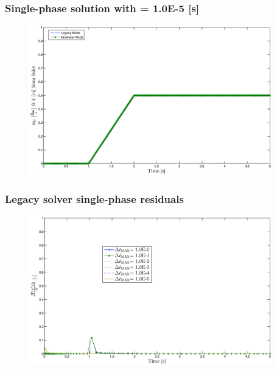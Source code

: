 \documentclass[compress,xcolor=table]{beamer}
\begin{document}
\begin{frame}
\frametitle{Single-phase solution with \dtmax{} = 1.0E-5 {[s]}}

\begin{figure}[h!t]
\centering
\includegraphics[width=0.94\textwidth]{images/single_1em5.eps}
\end{figure}

\end{frame}
\begin{frame}
\frametitle{Legacy solver single-phase residuals}

\begin{figure}[h!t]
\centering
\includegraphics[width=0.94\textwidth]{images/cobra_single_res_v_dt.eps}
\end{figure}

\end{frame}
\end{document}
